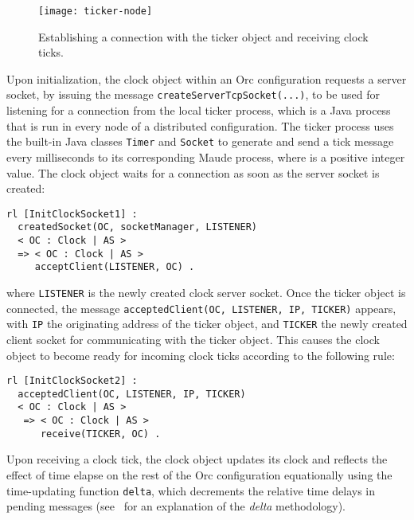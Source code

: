 \documentclass{eptcs}
\begin{document}
\begin{figure} 	
	\centering
	\texttt{[image: ticker-node]}
	\caption{Establishing a connection with the ticker object and receiving clock ticks.}
    \label{fig:ticker-node}
\end{figure}


Upon initialization, the clock object within an Orc configuration requests a server socket, by issuing the message \texttt{createServerTcpSocket(...)}, to be used for listening for a connection from the local ticker process, which is a Java process that is run in every node of a distributed configuration. The ticker process uses the built-in Java classes \texttt{Timer} and \texttt{Socket} to generate and send a tick message every  milliseconds to its corresponding Maude process, where  is a positive integer value. The clock object waits for a connection as soon as the server socket is created:

\begin{small}
\begin{verbatim}
rl [InitClockSocket1] :
  createdSocket(OC, socketManager, LISTENER)
  < OC : Clock | AS >  
  => < OC : Clock | AS > 
     acceptClient(LISTENER, OC) .
\end{verbatim}
\end{small}

\noindent where \texttt{LISTENER} is the newly created clock server socket. 
Once the ticker object is connected, the message \texttt{acceptedClient(OC, LISTENER, IP, TICKER)} appears, with \texttt{IP} the originating address of the ticker object, and \texttt{TICKER} the newly created client socket for communicating with the ticker object. This causes the clock object to become ready for incoming clock ticks according to the following rule:

\begin{small}
\begin{verbatim}
rl [InitClockSocket2] : 
  acceptedClient(OC, LISTENER, IP, TICKER)
  < OC : Clock | AS >  
   => < OC : Clock | AS > 
      receive(TICKER, OC) .
\end{verbatim}
\end{small}

Upon receiving a clock tick, the clock object updates its clock and reflects the effect of time elapse on the rest of the Orc configuration equationally using the time-updating function \texttt{delta}, which decrements the relative time delays in pending messages (see~\cite{journ-rtm} for an explanation of the \emph{delta} methodology). 
\end{document}

